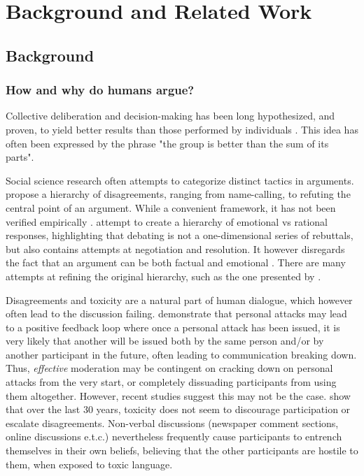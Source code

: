 %
\chapter{Background and Related Work}
\label{sec:related}

\section{Background}
\label{sec:related:sec1}


\subsection{How and why do humans argue?}
\label{sec:background:arguments-how}

Collective deliberation and decision-making has been long hypothesized, and proven, to yield better results than those performed by individuals \cite{david-collaborative, stefan-dissent}. This idea has often been expressed by the phrase "the group is better than the sum of its parts". 

Social science research often attempts to categorize distinct tactics in arguments. \citet{graham2008disagree} propose a hierarchy of disagreements, ranging from name-calling, to refuting the central point of an argument.  While a convenient framework, it has not been verified empirically \cite{dekock2022disagree}. \citet{walker-etal-2012-corpus} attempt to create a hierarchy of emotional vs rational responses, highlighting that debating is not a one-dimensional series of rebuttals, but also contains attempts at negotiation and resolution. It however disregards the fact that an argument can be both factual and emotional \cite{dekock2022disagree}. There are many attempts at refining the original hierarchy, such as the one presented by \citet{benesch2016counterspeech}.

Disagreements and toxicity are a natural part of human dialogue, which however often lead to the discussion failing. \citet{dekock2022disagree} demonstrate that personal attacks may lead to a positive feedback loop where once a personal attack has been issued, it is very likely that another will be issued both by the same person and/or by another participant in the future, often leading to communication breaking down. Thus, \textit{effective} moderation may be contingent on cracking down on personal attacks from the very start, or completely dissuading participants from using them altogether. However, recent studies suggest this may not be the case. \citet{Avalle2024PersistentIP} show that over the last 30 years, toxicity does not seem to discourage participation or escalate disagreements. Non-verbal discussions (newspaper comment sections, online discussions e.t.c.) nevertheless frequently cause participants to entrench themselves in their own beliefs, believing that the other participants are hostile to them, when exposed to toxic language.

